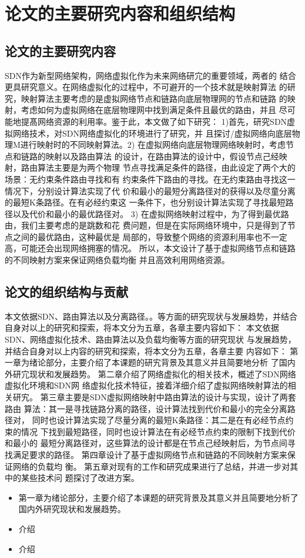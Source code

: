 \section{论文的主要研究内容和组织结构}
\subsection{论文的主要研究内容}
SDN作为新型网络架构，网络虚拟化作为未来网络研宂的重要领域，两者的 结合更具研究意义。在网络虚拟化的过程中，不可避开的一个技术就是映射算法 的研究，映射算法主要考虑的是虚拟网络节点和链路向底层物理网的节点和链路 的映射，考虑如何为虚拟网络在底层物理网中找到满足条件且最优的路由，并且 尽可能地提髙网络资源的利用率。鉴于此，本文做了如下研究：
1)首先，研究SDN虚拟网络技术，对SDN网络虚拟化的环境进行了研究，并 且探讨/虚拟网络向底层物理M进行映射时的不同映射算法。2)	在虚拟网络向底层物理网络映射时，考虑节点和链路的映射以及路由算法 的设计，在路由算法的设计中，假设节点己经映射，路由算法主要是为两个物理 节点寻找满足条件的路径，由此设定了两个大的场景：无约束条件路由寻找和有 约束条件下路由的寻找。在无约束路由寻找这一情况下，分别设计算法实现了代 价和最小的最短分离路径对的获得以及尽童分离的最短K条路径。在有必经约束这 一条件下，也分别设计算法实现了寻找最短路径以及代价和最小的最优路径对。
3)	在虚拟网络映射过程中，为了得到最优路由，我们主要考虑的是跳数和花 费问题，但是在实际网络环境中，只是得到了节点之间的最优路由，这种最优是 局部的，导致整个网络的资源利用率也不一定高，可能还会出现网络拥塞的情况。 所以，本文设计了基于虚拟网络节点和链路的不同映射方案来保证网络负载均衡 并且高效利用网络资源。

\subsection{论文的组织结构与贡献}
本文依据SDN、路由算法以及分离路径。。等方面的研究现状与发展趋势，并结合自身对以上的研究和探索，将本文分为五章，各章主要内容如下：
本文依据SDN、网络虚拟化技术、路由算法以及负载均衡等方面的研究现状 与发展趋势，并结合自身对以上内容的研究和探索，将本文分为五章，各章主要 内容如下：
第一章为绪论部分，主要介绍了本课题的研宄背景及其意义并且简要地分析 了国内外研宂现状和发展趋势。
第二章介绍了网络虚拟化的相关技术，概述了SDN网络虚拟化环境和SDN网 络虚拟化技术特征，接着洋细介绍了虚拟网络映射算法的相关研宄。
第三章主要是SDN虚拟网络映射中路由算法的设计与实现，设计了两套路由 算法：其一是寻找链路分离的路径，设计算法找到代价和最小的完全分离路径对， 同时也设计算法实现了尽量分离的最短K条路径：其二是在有必经节点约束的情况 下找到最短路径，同时也设计算法在有必经节点约束的限制下找到代价和最小的 最短分离路径对，这些算法的设计都是在节点己经映射后，为节点间寻找满足要求的路径。
第四章设计了基于虚拟网络节点和链路的不同映射方案来保证网络的负载均 衡。
第五章对现有的工作和研究成果进行了总结，并进一步对其中的某些技术问 题探讨了改进方案。
\begin{itemize}
  \item 第一章为绪论部分，主要介绍了本课题的研究背景及其意义并且简要地分析了国内外研究现状和发展趋势。
  \item 介绍
  \item 介绍
\end{itemize}
